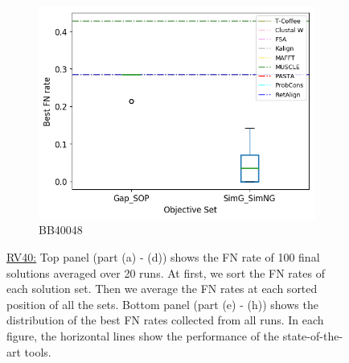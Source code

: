 \begin{figure}[!htbp]
\begin{adjustwidth}{-1cm}{-1cm}
\begin{subfigure}{0.22\textwidth}
			\includegraphics[width=\columnwidth]{Figure/summary/precomputedInit/Balibase/BB40048_objset_fnrate_rank}
			\caption{BB40048}
		\end{subfigure}
		\caption{\underline{RV40:} Top panel (part (a) - (d)) shows the FN rate of 100 final solutions averaged over 20 runs. At first, we sort the FN rates of each solution set. Then we average the FN rates at each sorted position of all the sets. Bottom panel (part (e) - (h)) shows the distribution of the best FN rates collected from all runs. In each figure, the horizontal lines show the performance of the state-of-the-art tools.}
		\label{fig:rv40_fn_rate}
	\end{adjustwidth}
\end{figure}



